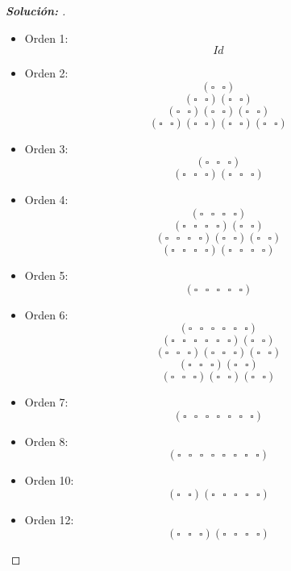 \documentclass[12pt]{article}
\begin{document}
\begin{enumerate}
\begin{proof}[\textbf{Solución: }]
\begin{itemize}
    \item Orden 1:
    $$Id$$
    \item Orden 2:
    $$(\square\textbf{ }\square)$$
    $$(\square\textbf{ }\square)(\square\textbf{ }\square)$$
    $$(\square\textbf{ }\square)(\square\textbf{ }\square)(\square\textbf{ }\square)$$
    $$(\square\textbf{ }\square)(\square\textbf{ }\square)(\square\textbf{ }\square)(\square\textbf{ }\square)$$
    \item Orden 3:
    $$(\square\textbf{ }\square\textbf{ }\square)$$
    $$(\square\textbf{ }\square\textbf{ }\square)(\square\textbf{ }\square\textbf{ }\square)$$
    \item Orden 4:
    $$(\square\textbf{ }\square\textbf{ }\square\textbf{ }\square)$$
    $$(\square\textbf{ }\square\textbf{ }\square\textbf{ }\square)(\square\textbf{ }\square)$$
    $$(\square\textbf{ }\square\textbf{ }\square\textbf{ }\square)(\square\textbf{ }\square)(\square\textbf{ }\square)$$
    $$(\square\textbf{ }\square\textbf{ }\square\textbf{ }\square)(\square\textbf{ }\square\textbf{ }\square\textbf{ }\square)$$
    \item Orden 5:
    $$(\square\textbf{ }\square\textbf{ }\square\textbf{ }\square\textbf{ }\square)$$
    \item Orden 6:
    $$(\square\textbf{ }\square\textbf{ }\square\textbf{ }\square\textbf{ }\square\textbf{ }\square)$$
    $$(\square\textbf{ }\square\textbf{ }\square\textbf{ }\square\textbf{ }\square\textbf{ }\square)(\square\textbf{ }\square)$$
    $$(\square\textbf{ }\square\textbf{ }\square)(\square\textbf{ }\square\textbf{ }\square)(\square\textbf{ }\square)$$
    $$(\square\textbf{ }\square\textbf{ }\square)(\square\textbf{ }\square)$$
    $$(\square\textbf{ }\square\textbf{ }\square)(\square\textbf{ }\square)(\square\textbf{ }\square)$$
    \item Orden 7:
    $$(\square\textbf{ }\square\textbf{ }\square\textbf{ }\square\textbf{ }\square\textbf{ }\square\textbf{ }\square)$$
    \item Orden 8:
    $$(\square\textbf{ }\square\textbf{ }\square\textbf{ }\square\textbf{ }\square\textbf{ }\square\textbf{ }\square\textbf{ }\square)$$
    \item Orden 10:
    $$(\square\textbf{ }\square)(\square\textbf{ }\square\textbf{ }\square\textbf{ }\square\textbf{ }\square)$$
    \item Orden 12:
    $$(\square\textbf{ }\square\textbf{ }\square)(\square\textbf{ }\square\textbf{ }\square\textbf{ }\square)$$

\end{itemize}
\end{proof}
\end{enumerate}
\end{document}
